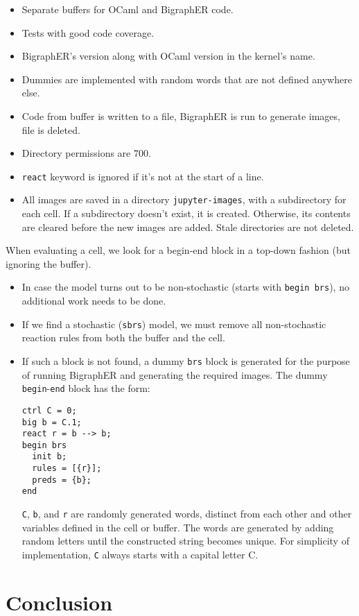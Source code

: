 \documentclass{article}
\begin{document}
\begin{itemize}
\item Separate buffers for OCaml and BigraphER code.
\item Tests with good code coverage.
\item BigraphER's version along with OCaml version in the kernel's name.
\item Dummies are implemented with random words that are not defined anywhere else.
\item Code from buffer is written to a file, BigraphER is run to generate
  images, file is deleted.
\item Directory permissions are $700$.
\item \texttt{react} keyword is ignored if it's not at the start of a line.
\item All images are saved in a directory \texttt{jupyter-images}, with a
  subdirectory for each cell. If a subdirectory doesn't exist, it is created.
  Otherwise, its contents are cleared before the new images are added. Stale
  directories are not deleted.
\end{itemize}

When evaluating a cell, we look for a begin-end block in a top-down
fashion (but ignoring the buffer).
\begin{itemize}
\item In case the model turns out to be non-stochastic (starts with
  \texttt{begin brs}), no additional work needs to be done.
\item If we find a stochastic (\texttt{sbrs}) model, we must remove all
  non-stochastic reaction rules from both the buffer and the cell.
\item If such a block is not found, a dummy \texttt{brs} block is generated
  for the purpose of running BigraphER and generating the required images. The
  dummy \texttt{begin}-\texttt{end} block has the form:
  \begin{lstlisting}
ctrl C = 0;
big b = C.1;
react r = b --> b;
begin brs
  init b;
  rules = [{r}];
  preds = {b};
end
\end{lstlisting}
\texttt{C}, \texttt{b}, and \texttt{r} are randomly generated words,
distinct from each other and other variables defined in the cell or buffer.
The words are generated by adding random letters until the constructed
string becomes unique. For simplicity of implementation, \texttt{C} always
starts with a capital letter C.
\end{itemize}

\section{Conclusion}



\end{document}
